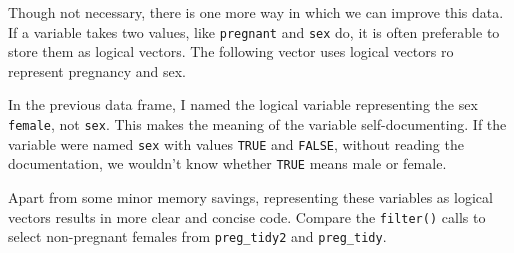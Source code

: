 \documentclass[]{book}
\newenvironment{Shaded}{\begin{snugshade}}{\end{snugshade}}
\newcommand{\CommentTok}[1]{\textcolor[rgb]{0.56,0.35,0.01}{\textit{#1}}}
\newcommand{\DataTypeTok}[1]{\textcolor[rgb]{0.13,0.29,0.53}{#1}}
\newcommand{\KeywordTok}[1]{\textcolor[rgb]{0.13,0.29,0.53}{\textbf{#1}}}
\newcommand{\NormalTok}[1]{#1}
\newcommand{\OperatorTok}[1]{\textcolor[rgb]{0.81,0.36,0.00}{\textbf{#1}}}
\newcommand{\OtherTok}[1]{\textcolor[rgb]{0.56,0.35,0.01}{#1}}
\newcommand{\StringTok}[1]{\textcolor[rgb]{0.31,0.60,0.02}{#1}}
\theoremstyle{plain}
\theoremstyle{remark}
\begin{document}
\begin{Shaded}
\end{Shaded}

Though not necessary, there is one more way in which we can improve this
data. If a variable takes two values, like \texttt{pregnant} and
\texttt{sex} do, it is often preferable to store them as logical
vectors. The following vector uses logical vectors ro represent
pregnancy and sex.

\begin{Shaded}
\end{Shaded}

In the previous data frame, I named the logical variable representing
the sex \texttt{female}, not \texttt{sex}. This makes the meaning of the
variable self-documenting. If the variable were named \texttt{sex} with
values \texttt{TRUE} and \texttt{FALSE}, without reading the
documentation, we wouldn't know whether \texttt{TRUE} means male or
female.

Apart from some minor memory savings, representing these variables as
logical vectors results in more clear and concise code. Compare the
\texttt{filter()} calls to select non-pregnant females from
\texttt{preg\_tidy2} and \texttt{preg\_tidy}.
\end{document}
